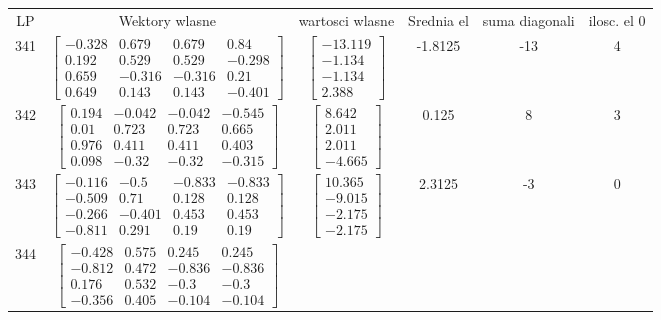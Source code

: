 \documentclass[a4paper,12pt]{article}
\begin{document}
\bgroup {} \vspace{0.2in} \begin{tabular}{c c c c c c}
LP &Wektory wlasne & wartosci wlasne & Srednia el & suma diagonali & ilosc. el 0\\
341
&
$\begin{bmatrix} -0.328 & 0.679 & 0.679 & 0.84 \\ 0.192 & 0.529 & 0.529 & -0.298 \\ 0.659 & -0.316 & -0.316 & 0.21 \\ 0.649 & 0.143 & 0.143 & -0.401 \end{bmatrix}$
&
$\begin{bmatrix} -13.119 \\ -1.134 \\ -1.134 \\ 2.388 \end{bmatrix}$
&
-1.8125
&
-13
&
4
\\
342
&
$\begin{bmatrix} 0.194 & -0.042 & -0.042 & -0.545 \\ 0.01 & 0.723 & 0.723 & 0.665 \\ 0.976 & 0.411 & 0.411 & 0.403 \\ 0.098 & -0.32 & -0.32 & -0.315 \end{bmatrix}$
&
$\begin{bmatrix} 8.642 \\ 2.011 \\ 2.011 \\ -4.665 \end{bmatrix}$
&
0.125
&
8
&
3
\\
343
&
$\begin{bmatrix} -0.116 & -0.5 & -0.833 & -0.833 \\ -0.509 & 0.71 & 0.128 & 0.128 \\ -0.266 & -0.401 & 0.453 & 0.453 \\ -0.811 & 0.291 & 0.19 & 0.19 \end{bmatrix}$
&
$\begin{bmatrix} 10.365 \\ -9.015 \\ -2.175 \\ -2.175 \end{bmatrix}$
&
2.3125
&
-3
&
0
\\
344
&
$\begin{bmatrix} -0.428 & 0.575 & 0.245 & 0.245 \\ -0.812 & 0.472 & -0.836 & -0.836 \\ 0.176 & 0.532 & -0.3 & -0.3 \\ -0.356 & 0.405 & -0.104 & -0.104 \end{bmatrix}$

\end{tabular}
\end{document}
